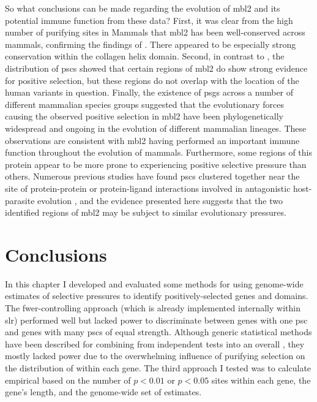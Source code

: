 So what conclusions can be made regarding the evolution of \ac{mbl2}
and its potential immune function from these \sw data? First, it was
clear from the high number of purifying sites in Mammals that
\ac{mbl2} has been well-conserved across mammals, confirming the
findings of \citet{Falzacappa2004}. There appeared to be especially
strong conservation within the collagen helix domain. Second, in
contrast to \citet{Falzacappa2004}, the distribution of \acp{psc}
showed that certain regions of \ac{mbl2} do show strong evidence for
positive selection, but these regions do not overlap with the location
of the human variants in question. Finally, the existence of \acp{psg}
across a number of different mammalian species groups suggested that
the evolutionary forces causing the observed positive selection in
\ac{mbl2} have been phylogenetically widespread and ongoing in the
evolution of different mammalian lineages. These observations are
consistent with \ac{mbl2} having performed an important immune
function throughout the evolution of mammals. Furthermore, some
regions of this protein appear to be more prone to experiencing
positive selective pressure than others.  Numerous previous studies
have found \acp{psc} clustered together near the site of
protein-protein or protein-ligand interactions involved in
antagonistic host-parasite evolution
\citep{Sawyer2005a,Kosiol2008,GuiraoRico2009,Huang2011}, and the
evidence presented here suggests that the two identified regions of
\ac{mbl2} may be subject to similar evolutionary pressures.

\section{Conclusions}

In this chapter I developed and evaluated some methods for using
genome-wide estimates of \sw selective pressures to identify
positively-selected genes and domains. The \acf{fwer}-controlling
approach (which is already implemented internally within \ac{slr})
performed well but lacked power to discriminate between genes with one
\ac{psc} and genes with many \acp{psc} of equal strength. Although
generic statistical methods have been described for combining \pvs
from independent tests into an overall \pv, they mostly lacked power
due to the overwhelming influence of purifying selection on the
distribution of \sw \pvs within each gene. The third approach I tested
was to calculate empirical \pvs based on the number of $p<0.01$ or
$p<0.05$ sites within each gene, the gene's length, and the
genome-wide set of \sw estimates.

